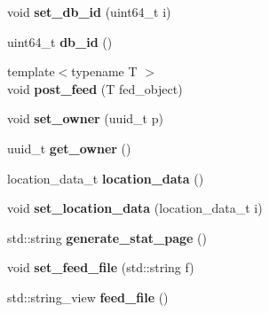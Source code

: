 \begin{DoxyCompactItemize}
void {\bfseries set\+\_\+db\+\_\+id} (uint64\+\_\+t i)
\item 
\mbox{\label{structobj__data_a768ad168c38dd1de4c51c77d77b8f830}} 
uint64\+\_\+t {\bfseries db\+\_\+id} ()
\item 
\mbox{\label{structobj__data_af8838a3acb17974161ced6008dbc0329}} 
{\footnotesize template$<$typename T $>$ }\\void {\bfseries post\+\_\+feed} (T fed\+\_\+object)
\item 
\mbox{\label{structobj__data_a26cc632406e1647b2aad86024b41ef7d}} 
void {\bfseries set\+\_\+owner} (uuid\+\_\+t p)
\item 
\mbox{\label{structobj__data_ae44c9aec7efacb48040cb4e8e3ccea85}} 
uuid\+\_\+t {\bfseries get\+\_\+owner} ()
\item 
\mbox{\label{structobj__data_aac7cee17fb9dbb69e30b972fd3749b37}} 
location\+\_\+data\+\_\+t {\bfseries location\+\_\+data} ()
\item 
\mbox{\label{structobj__data_a52e67c2cb1c02d7d72dadbc47b2ce93f}} 
void {\bfseries set\+\_\+location\+\_\+data} (location\+\_\+data\+\_\+t i)
\item 
\mbox{\label{structobj__data_ab51d261012414f61e2d028ee71892731}} 
std\+::string {\bfseries generate\+\_\+stat\+\_\+page} ()
\item 
\mbox{\label{structobj__data_abeaf5cae3645dbf7b764cfb6b62a82c3}} 
void {\bfseries set\+\_\+feed\+\_\+file} (std\+::string f)
\item 
\mbox{\label{structobj__data_a4ebed328e9028591a51dd89f26f8b5ab}} 
std\+::string\+\_\+view {\bfseries feed\+\_\+file} ()
\end{DoxyCompactItemize}
